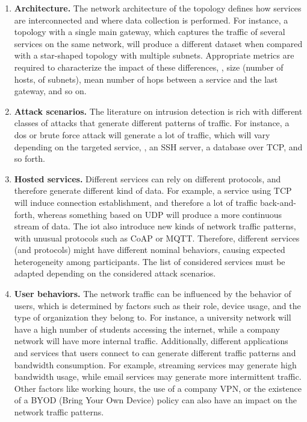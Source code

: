 \begin{enumerate}
  \item \textbf{Architecture.}
  The network architecture of the topology defines how services are interconnected and where data collection is performed.
  For instance, a topology with a single main gateway, which captures the traffic of several services on the same network, will produce a different dataset when compared with a star-shaped topology with multiple subnets.
  Appropriate metrics are required to characterize the impact of these differences, \eg, size (number of hosts, of subnets), mean number of hops between a service and the last gateway, and so on.
  
  \item \textbf{Attack scenarios.}
  The literature on intrusion detection is rich with different classes of attacks that generate different patterns of traffic.
  For instance, a \gls{dos} or brute force attack will generate a lot of traffic, which will vary depending on the targeted service, \eg, an SSH server, a database over TCP, and so forth.

  \item \textbf{Hosted services.}
  Different services can rely on different protocols, and therefore generate different kind of data.
  For example, a service using TCP will induce connection establishment, and therefore a lot of traffic back-and-forth, whereas something based on UDP will produce a more continuous stream of data.
  The \gls{iot} also introduce new kinds of network traffic patterns, with unusual protocols such as CoAP or MQTT.
  Therefore, different services (and protocols) might have different nominal behaviors, causing expected heterogeneity among participants.
  The list of considered services must be adapted depending on the considered attack scenarios. 

  \item \textbf{User behaviors.}
  The network traffic can be influenced by the behavior of users, which is determined by factors such as their role, device usage, and the type of organization they belong to.
  For instance, a university network will have a high number of students accessing the internet, while a company network will have more internal traffic.
  Additionally, different applications and services that users connect to can generate different traffic patterns and bandwidth consumption.
  For example, streaming services may generate high bandwidth usage, while email services may generate more intermittent traffic.
  Other factors like working hours, the use of a company VPN, or the existence of a BYOD (Bring Your Own Device) policy can also have an impact on the network traffic patterns.


\end{enumerate}
